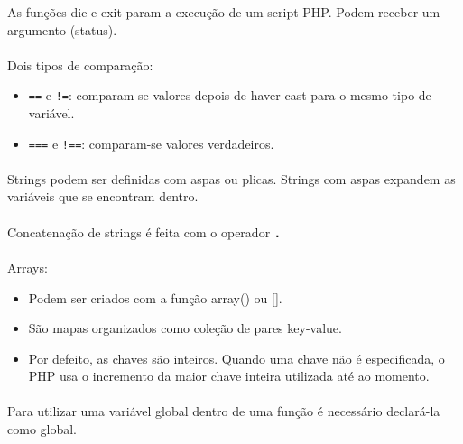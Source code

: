 \documentclass[../resumosLTW.tex]{subfiles}
\begin{document}
As funções die e exit param a execução de um script PHP. Podem receber um argumento (status).

\paragraph{}

Dois tipos de comparação:
\begin{itemize}
    \item \lstinline{==} e \lstinline{!=}: comparam-se valores depois de haver cast para o mesmo tipo de variável.
    \item \lstinline{===} e \lstinline{!==}: comparam-se valores verdadeiros.
\end{itemize}

\paragraph{}

Strings podem ser definidas com aspas ou plicas. Strings com aspas expandem as variáveis que se encontram dentro.

\paragraph{}

Concatenação de strings é feita com o operador \textbf{\lstinline{.}}

\paragraph{}

Arrays:
\begin{itemize}
    \item Podem ser criados com a função array() ou [].
    \item São mapas organizados como coleção de pares key-value.
    \item Por defeito, as chaves são inteiros. Quando uma chave não é especificada, o PHP usa o incremento da maior chave inteira utilizada até ao momento.
\end{itemize}

\paragraph{}

Para utilizar uma variável global dentro de uma função é necessário declará-la como global.
\end{document}
